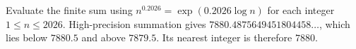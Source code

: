 Evaluate the finite sum using $n^{0.2026}=\exp(0.2026\log n)$ for each integer $1\le n\le2026$. High-precision summation gives $7880.4875649451804458\ldots$, which lies below $7880.5$ and above $7879.5$. Its nearest integer is therefore $\boxed{7880}$.
